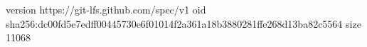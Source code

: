 version https://git-lfs.github.com/spec/v1
oid sha256:dc00fd5e7edff00445730e6f01014f2a361a18b3880281ffe268d13ba82c5564
size 11068
